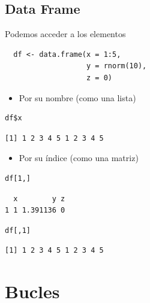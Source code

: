 \documentclass[xcolor={usenames,svgnames,dvipsnames}]{beamer}
\begin{document}
\subsection{Data Frame}
\label{sec:orgheadline53}
\begin{frame}[fragile,label={sec:orgheadline52}]{Podemos acceder a los elementos}
 \lstset{language=R,label= ,caption= ,captionpos=b,numbers=none}
\begin{lstlisting}
  df <- data.frame(x = 1:5,
                   y = rnorm(10),
                   z = 0)
\end{lstlisting}

\begin{itemize}
\item Por su nombre (como una lista)
\end{itemize}
\lstset{language=R,label= ,caption= ,captionpos=b,numbers=none}
\begin{lstlisting}
df$x
\end{lstlisting}

\begin{verbatim}
[1] 1 2 3 4 5 1 2 3 4 5
\end{verbatim}

\begin{itemize}
\item Por su índice (como una matriz)
\end{itemize}
\lstset{language=R,label= ,caption= ,captionpos=b,numbers=none}
\begin{lstlisting}
df[1,]
\end{lstlisting}

\begin{verbatim}
  x        y z
1 1 1.391136 0
\end{verbatim}

\lstset{language=R,label= ,caption= ,captionpos=b,numbers=none}
\begin{lstlisting}
df[,1]
\end{lstlisting}

\begin{verbatim}
[1] 1 2 3 4 5 1 2 3 4 5
\end{verbatim}
\end{frame}

\section{Bucles}
\label{sec:orgheadline64}
\end{document}
